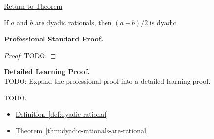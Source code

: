 \newpage
{}
\label{prf:dyadic-midpoint-closure}

\begin{remark*}[Return]
\hyperref[thm:dyadic-midpoint-closure]{Return to Theorem}
\end{remark*}

\begin{theorem*}
If $a$ and $b$ are dyadic rationals, then $(a+b)/2$ is dyadic.
\end{theorem*}

\textbf{Professional Standard Proof.}~\\
\begin{proof}
TODO.
\end{proof}

\textbf{Detailed Learning Proof.}~\\
TODO: Expand the professional proof into a detailed learning proof.


\begin{remark*}
TODO.
\end{remark*}

\begin{dependencies}
\begin{itemize}
  \item \hyperref[def:dyadic-rational]{Definition~\ref*{def:dyadic-rational}}
  \item \hyperref[thm:dyadic-rationals-are-rational]{Theorem~\ref*{thm:dyadic-rationals-are-rational}}
\end{itemize}
\end{dependencies}

